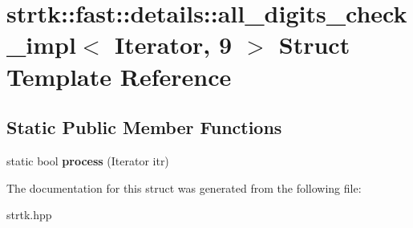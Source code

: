 \hypertarget{structstrtk_1_1fast_1_1details_1_1all__digits__check__impl_3_01Iterator_00_019_01_4}{\section{strtk\-:\-:fast\-:\-:details\-:\-:all\-\_\-digits\-\_\-check\-\_\-impl$<$ Iterator, 9 $>$ Struct Template Reference}
\label{structstrtk_1_1fast_1_1details_1_1all__digits__check__impl_3_01Iterator_00_019_01_4}
}
\subsection*{Static Public Member Functions}
\begin{DoxyCompactItemize}
\item 
\hypertarget{structstrtk_1_1fast_1_1details_1_1all__digits__check__impl_3_01Iterator_00_019_01_4_a6221eb47f6d95778a9ce49526eeb3984}{static bool {\bfseries process} (Iterator itr)}\label{structstrtk_1_1fast_1_1details_1_1all__digits__check__impl_3_01Iterator_00_019_01_4_a6221eb47f6d95778a9ce49526eeb3984}

\end{DoxyCompactItemize}


The documentation for this struct was generated from the following file\-:\begin{DoxyCompactItemize}
\item 
strtk.\-hpp\end{DoxyCompactItemize}

